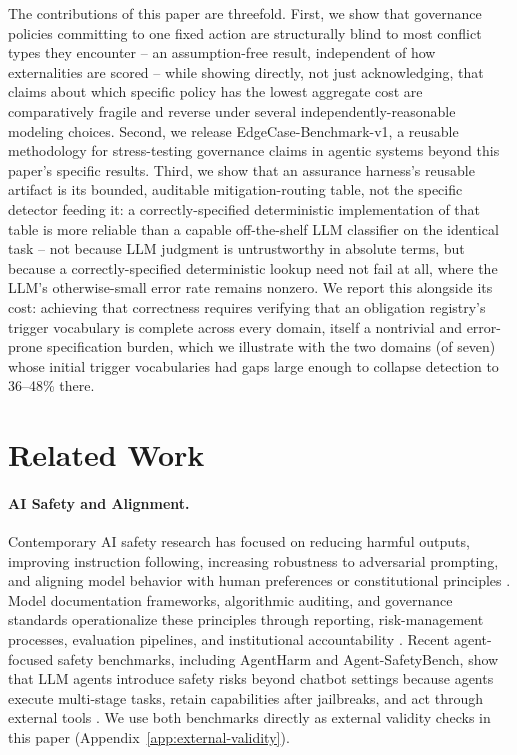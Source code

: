 \documentclass[letterpaper]{article} %
\begin{document}
The contributions of this paper are threefold. First, we show that governance policies committing to one fixed action are structurally blind to most conflict types they encounter -- an assumption-free result, independent of how externalities are scored -- while showing directly, not just acknowledging, that claims about which specific policy has the lowest aggregate cost are comparatively fragile and reverse under several independently-reasonable modeling choices. Second, we release EdgeCase-Benchmark-v1, a reusable methodology for stress-testing governance claims in agentic systems beyond this paper's specific results. Third, we show that an assurance harness's reusable artifact is its bounded, auditable mitigation-routing table, not the specific detector feeding it: a correctly-specified deterministic implementation of that table is more reliable than a capable off-the-shelf LLM classifier on the identical task -- not because LLM judgment is untrustworthy in absolute terms, but because a correctly-specified deterministic lookup need not fail at all, where the LLM's otherwise-small error rate remains nonzero. We report this alongside its cost: achieving that correctness requires verifying that an obligation registry's trigger vocabulary is complete across every domain, itself a nontrivial and error-prone specification burden, which we illustrate with the two domains (of seven) whose initial trigger vocabularies had gaps large enough to collapse detection to 36--48\% there.

\section{Related Work}
\paragraph{AI Safety and Alignment.} Contemporary AI safety research has focused on reducing harmful outputs, improving instruction following, increasing robustness to adversarial prompting, and aligning model behavior with human preferences or constitutional principles \citep{ouyang2022training,bai2022constitutional,ganguli2022redteaming}. Model documentation frameworks, algorithmic auditing, and governance standards operationalize these principles through reporting, risk-management processes, evaluation pipelines, and institutional accountability \citep{mitchell2019modelcards,gebru2021datasheets,raji2020closing,nist2023airmf,eu2024ai}. Recent agent-focused safety benchmarks, including AgentHarm and Agent-SafetyBench, show that LLM agents introduce safety risks beyond chatbot settings because agents execute multi-stage tasks, retain capabilities after jailbreaks, and act through external tools \citep{andriushchenko2024agentharm,zhang2024agentsafetybench}. We use both benchmarks directly as external validity checks in this paper (Appendix~\ref{app:external-validity}).
\end{document}
